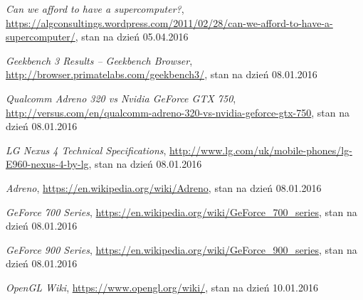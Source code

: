 \begin{thebibliography}{999}
 \emph{Can we afford to have a supercomputer?}, \linebreak \href{https://algconsultings.wordpress.com/2011/02/28/can-we-afford-to-have-a-supercomputer/}{https://algconsultings.wordpress.com/2011/02/28/can-we-afford-to-have-a-supercomputer/}, stan na dzień 05.04.2016

 \emph{Geekbench 3 Results -- Geekbench Browser}, \href{http://browser.primatelabs.com/geekbench3/}{http://browser.primatelabs.com/geekbench3/}, stan na dzień 08.01.2016

 \emph{Qualcomm Adreno 320 vs Nvidia GeForce GTX 750}, \href{http://versus.com/en/qualcomm-adreno-320-vs-nvidia-geforce-gtx-750}{http://versus.com/en/qualcomm-adreno-320-vs-nvidia-geforce-gtx-750}, stan na dzień 08.01.2016

 \emph{LG Nexus 4 Technical Specifications}, \href{http://www.lg.com/uk/mobile-phones/lg-E960-nexus-4-by-lg}{http://www.lg.com/uk/mobile-phones/lg-E960-nexus-4-by-lg}, stan na dzień 08.01.2016

 \emph{Adreno}, \href{https://en.wikipedia.org/wiki/Adreno}{https://en.wikipedia.org/wiki/Adreno}, stan na dzień 08.01.2016

 \emph{GeForce 700 Series}, \href{https://en.wikipedia.org/wiki/GeForce_700_series}{https://en.wikipedia.org/wiki/GeForce\_700\_series}, stan na dzień 08.01.2016

 \emph{GeForce 900 Series}, \href{https://en.wikipedia.org/wiki/GeForce_900_series}{https://en.wikipedia.org/wiki/GeForce\_900\_series}, stan na dzień 08.01.2016

 \emph{OpenGL Wiki}, \href{https://www.opengl.org/wiki/}{https://www.opengl.org/wiki/}, stan na dzień 10.01.2016


\end{thebibliography}
